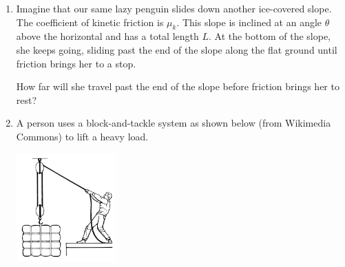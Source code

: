 \documentclass[12pt]{article}
\begin{document}
\begin{enumerate}
\item{Imagine that our same lazy penguin slides down another ice-covered slope. The coefficient of kinetic friction is $\mu_k$.
This slope is inclined at an angle $\theta$ above the horizontal and has a total length $L$. At the bottom of the slope, she keeps going, sliding past the end of the slope along the flat ground until friction brings her to a stop.

How far will she travel past the end of the slope before friction brings her to rest?}

%



%

\newpage
\item{A person uses a block-and-tackle system as shown below (from Wikimedia Commons) to lift a heavy load.

       \includegraphics[width=0.3\textwidth]{blockandtackle.png}

}
\end{enumerate}
\end{document}

